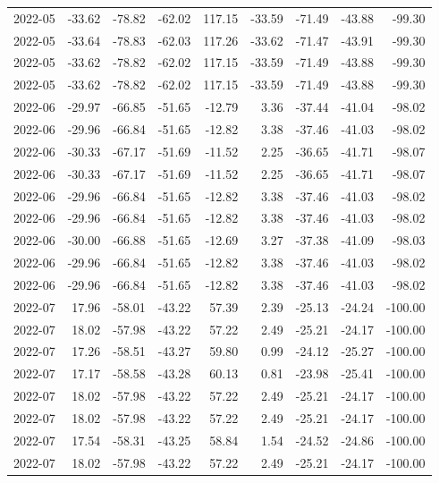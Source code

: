 \begin{table}[ht]
\begin{tabular}{lrrrrrrrr}
  2022-05 & -33.62 & -78.82 & -62.02 & 117.15 & -33.59 & -71.49 & -43.88 & -99.30 \\ 
  2022-05 & -33.64 & -78.83 & -62.03 & 117.26 & -33.62 & -71.47 & -43.91 & -99.30 \\ 
  2022-05 & -33.62 & -78.82 & -62.02 & 117.15 & -33.59 & -71.49 & -43.88 & -99.30 \\ 
  2022-05 & -33.62 & -78.82 & -62.02 & 117.15 & -33.59 & -71.49 & -43.88 & -99.30 \\ 
  2022-06 & -29.97 & -66.85 & -51.65 & -12.79 & 3.36 & -37.44 & -41.04 & -98.02 \\ 
  2022-06 & -29.96 & -66.84 & -51.65 & -12.82 & 3.38 & -37.46 & -41.03 & -98.02 \\ 
  2022-06 & -30.33 & -67.17 & -51.69 & -11.52 & 2.25 & -36.65 & -41.71 & -98.07 \\ 
  2022-06 & -30.33 & -67.17 & -51.69 & -11.52 & 2.25 & -36.65 & -41.71 & -98.07 \\ 
  2022-06 & -29.96 & -66.84 & -51.65 & -12.82 & 3.38 & -37.46 & -41.03 & -98.02 \\ 
  2022-06 & -29.96 & -66.84 & -51.65 & -12.82 & 3.38 & -37.46 & -41.03 & -98.02 \\ 
  2022-06 & -30.00 & -66.88 & -51.65 & -12.69 & 3.27 & -37.38 & -41.09 & -98.03 \\ 
  2022-06 & -29.96 & -66.84 & -51.65 & -12.82 & 3.38 & -37.46 & -41.03 & -98.02 \\ 
  2022-06 & -29.96 & -66.84 & -51.65 & -12.82 & 3.38 & -37.46 & -41.03 & -98.02 \\ 
  2022-07 & 17.96 & -58.01 & -43.22 & 57.39 & 2.39 & -25.13 & -24.24 & -100.00 \\ 
  2022-07 & 18.02 & -57.98 & -43.22 & 57.22 & 2.49 & -25.21 & -24.17 & -100.00 \\ 
  2022-07 & 17.26 & -58.51 & -43.27 & 59.80 & 0.99 & -24.12 & -25.27 & -100.00 \\ 
  2022-07 & 17.17 & -58.58 & -43.28 & 60.13 & 0.81 & -23.98 & -25.41 & -100.00 \\ 
  2022-07 & 18.02 & -57.98 & -43.22 & 57.22 & 2.49 & -25.21 & -24.17 & -100.00 \\ 
  2022-07 & 18.02 & -57.98 & -43.22 & 57.22 & 2.49 & -25.21 & -24.17 & -100.00 \\ 
  2022-07 & 17.54 & -58.31 & -43.25 & 58.84 & 1.54 & -24.52 & -24.86 & -100.00 \\ 
  2022-07 & 18.02 & -57.98 & -43.22 & 57.22 & 2.49 & -25.21 & -24.17 & -100.00 \\ 

\end{tabular}
\end{table}

